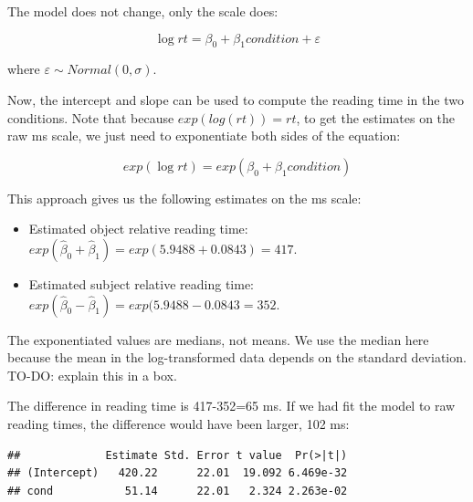 \documentclass[
  12pt,
]{krantz}
\newenvironment{Shaded}{\begin{snugshade}}{\end{snugshade}}
\newcommand{\FunctionTok}[1]{\textcolor[rgb]{0.00,0.00,0.00}{#1}}
\newcommand{\NormalTok}[1]{#1}
\newcommand{\OtherTok}[1]{\textcolor[rgb]{0.56,0.35,0.01}{#1}}
\newcommand{\SpecialCharTok}[1]{\textcolor[rgb]{0.00,0.00,0.00}{#1}}
\providecommand{\tightlist}{%
  \setlength{\itemsep}{0pt}\setlength{\parskip}{0pt}}
\theoremstyle{definition}
\theoremstyle{definition}
\theoremstyle{definition}
\theoremstyle{definition}
\theoremstyle{remark}
\begin{document}
The model does not change, only the scale does:

\begin{equation}
\log rt = \beta_0 + \beta_1 condition  + \varepsilon 
\end{equation}

where \(\varepsilon \sim Normal(0,\sigma)\).

Now, the intercept and slope can be used to compute the reading time in the two conditions.
Note that because \(exp(log(rt))=rt\), to get the estimates on the raw ms scale, we just need to exponentiate both sides of the equation:

\begin{equation}
exp(\log rt) = exp( \beta_0 + \beta_1 condition)
\end{equation}

This approach gives us the following estimates on the ms scale:

\begin{itemize}
\tightlist
\item
  Estimated object relative reading time: \(exp(\hat\beta_0+\hat\beta_1)=exp(5.9488+0.0843)=417\).
\item
  Estimated subject relative reading time: \(exp(\hat\beta_0-\hat\beta_1)=exp(5.9488-0.0843=352\).
\end{itemize}

The exponentiated values are medians, not means. We use the median here because the mean in the log-transformed data depends on the standard deviation. TO-DO: explain this in a box.

The difference in reading time is 417-352=65 ms. If we had fit the model to raw reading times, the difference would have been larger, 102 ms:

\begin{Shaded}
\end{Shaded}

\begin{verbatim}
##             Estimate Std. Error t value  Pr(>|t|)
## (Intercept)   420.22      22.01  19.092 6.469e-32
## cond           51.14      22.01   2.324 2.263e-02
\end{verbatim}
\end{document}
